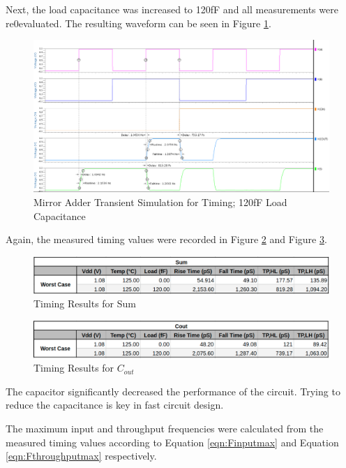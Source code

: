 \documentclass[11pt]{article}
\begin{document}
		Next, the load capacitance was increased to 120fF and all measurements were re0evaluated. The resulting waveform can be seen in Figure \ref{fig:timing-cap}.
	
		
		\begin{figure}[H]
			\centering
			\includegraphics[width=0.9\linewidth]{"Pictures/Timing Cap"}
			\caption{Mirror Adder Transient Simulation for Timing; 120fF Load Capacitance}
			\label{fig:timing-cap}
		\end{figure}
	
		Again, the measured timing values were recorded in Figure \ref{fig:sum-results} and Figure \ref{fig:cout-results}.
	
		\begin{figure}[H]
			\centering
			\includegraphics[width=0.7\linewidth]{"Pictures/Sum Results"}
			\caption{Timing Results for Sum}
			\label{fig:sum-results}
		\end{figure}
		
		
		\begin{figure}[H]
			\centering
			\includegraphics[width=0.7\linewidth]{"Pictures/Cout Results"}
			\caption{Timing Results for $C_{out}$}
			\label{fig:cout-results}
		\end{figure}
	
		The capacitor significantly decreased the performance of the circuit. Trying to reduce the capacitance is key in fast circuit design. 
		
		The maximum input and throughput frequencies were calculated from the measured timing values according to Equation \ref{eqn:Finputmax} and Equation \ref{eqn:Fthroughputmax} respectively. 
	
\end{document}
